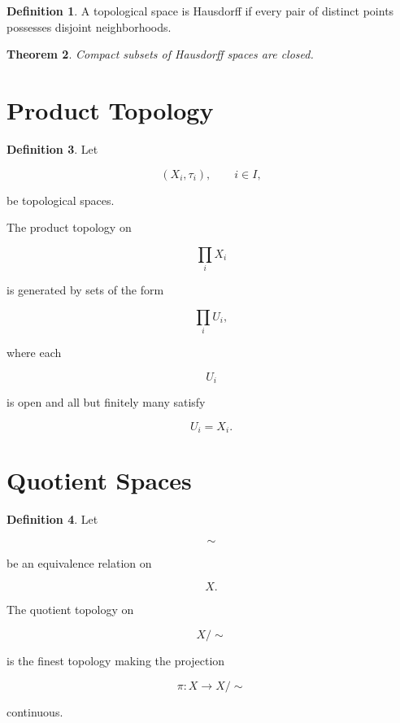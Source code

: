 \documentclass[11pt]{book}
\numberwithin{equation}{chapter}
\theoremstyle{definition}
\newtheorem{definition}{Definition}[chapter]
\theoremstyle{plain}
\newtheorem{theorem}[definition]{Theorem}
\begin{document}
\begin{definition}

A topological space is Hausdorff if every pair of distinct points
possesses disjoint neighborhoods.

\end{definition}


\begin{theorem}

Compact subsets of Hausdorff spaces are closed.

\end{theorem}


\section{Product Topology}

\begin{definition}

Let

\[
(X_i,\tau_i),
\qquad
i\in I,
\]

be topological spaces.

The product topology on

\[
\prod_i X_i
\]

is generated by sets of the form

\[
\prod_i U_i,
\]

where each

\[
U_i
\]

is open and all but finitely many satisfy

\[
U_i=X_i.
\]

\end{definition}


\section{Quotient Spaces}

\begin{definition}

Let

\[
\sim
\]

be an equivalence relation on

\[
X.
\]

The quotient topology on

\[
X/{\sim}
\]

is the finest topology making the projection

\[
\pi:X\to X/{\sim}
\]

continuous.

\end{definition}
\end{document}
